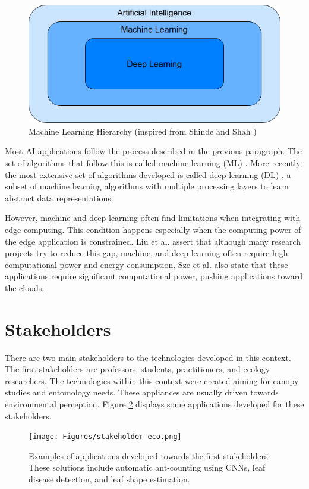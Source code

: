 \begin{figure}[h!]
    \centering
    \includegraphics[width=.7\linewidth]{Figures/AI-ML-DL.png}
    \caption{Machine Learning Hierarchy (inspired from Shinde and Shah \cite{shinde2018review})}
    \label{fig:ml-hierarchy}
\end{figure}

Most AI applications follow the process described in the previous paragraph. The set of algorithms that follow this is called machine learning (ML) \cite{el2015machine}. More recently, the most extensive set of algorithms developed is called deep learning (DL) \cite{lecun2015deep,gunning2019xai}, a subset of machine learning algorithms with multiple processing layers to learn abstract data representations.

However, machine and deep learning often find limitations when integrating with edge computing. This condition happens especially when the computing power of the edge application is constrained. Liu et al. \cite{liu2020survey} assert that although many research projects try to reduce this gap, machine, and deep learning often require high computational power and energy consumption. Sze et al. \cite{sze2017hardware} also state that these applications require significant computational power, pushing applications toward the clouds.

\section{Stakeholders}

There are two main stakeholders to the technologies developed in this context. The first stakeholders are professors, students, practitioners, and ecology researchers. The technologies within this context were created aiming for canopy studies and entomology needs. These appliances are usually driven towards environmental perception. Figure \ref{fig:stakeholder-eco} displays some applications developed for these stakeholders.

\begin{figure}[h!]
    \centering
    \texttt{[image: Figures/stakeholder-eco.png]}
    \caption{Examples of applications developed towards the first stakeholders. These solutions include automatic ant-counting using CNNs, leaf disease detection, and leaf shape estimation.}
    \label{fig:stakeholder-eco}
\end{figure}

